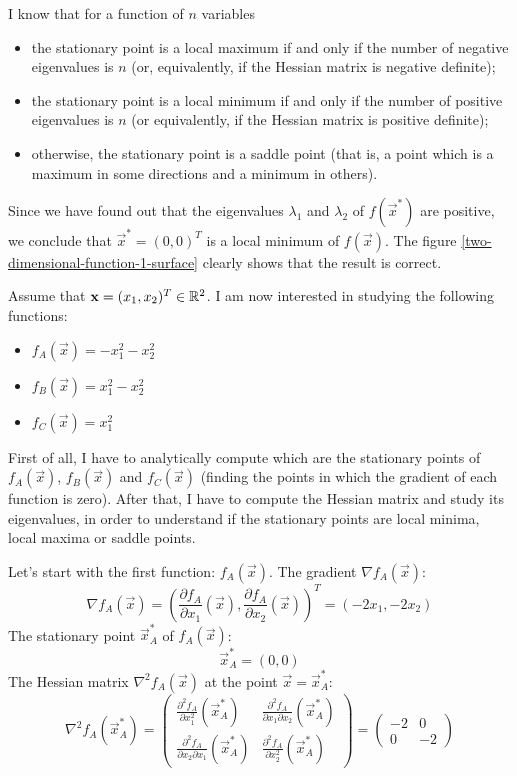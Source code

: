     I know that for a function of \(n\) variables
    \begin{itemize}
        \item the stationary point is a local maximum if and only if the number of negative eigenvalues is \(n\) (or, equivalently, if the Hessian matrix is negative definite);
        \item the stationary point is a local minimum if and only if the number of positive eigenvalues is \(n\) (or equivalently, if the Hessian matrix is positive definite);
        \item otherwise, the stationary point is a saddle point (that is, a point which is a maximum in some directions and a minimum in others).
    \end{itemize}
    Since we have found out that the eigenvalues \(\lambda_1\) and \(\lambda_2\) of \(f(\vec{x}^*)\) are positive, we conclude that \(\vec{x}^* = (0, 0)^T\) is a local minimum of \(f(\vec{x})\). The figure \ref{two-dimensional-function-1-surface} clearly shows that the result is correct.\par
    Assume that \(\mathbf{x} = (x_1, x_2)^T \in \mathbb{R}^2\). I am now interested in studying the following functions:
    \begin{itemize}
        \item \(f_A(\vec{x}) = -x_1^2-x_2^2\)
        \item \(f_B(\vec{x}) = x_1^2-x_2^2\)
        \item \(f_C(\vec{x}) = x_1^2\)
    \end{itemize}
    First of all, I have to analytically compute which are the stationary points of \(f_A(\vec{x})\), \(f_B(\vec{x})\) and \(f_C(\vec{x})\) (finding the points in which the gradient of each function is zero). After that, I have to compute the Hessian matrix and study its eigenvalues, in order to understand if the stationary points are local minima, local maxima or saddle points.\par
    Let's start with the first function: \(f_A(\vec{x})\). The gradient \(\nabla f_A(\vec{x})\):
    \[\nabla f_A(\vec{x}) = \left (\frac{\partial f_A}{\partial x_1}(\vec{x}), \frac{\partial f_A}{\partial x_2}(\vec{x}) \right )^T = (-2x_1, -2x_2)\]
    The stationary point \(\vec{x}_A^*\) of \(f_A(\vec{x})\):
    \[\vec{x}_A^* = (0, 0)\]
    The Hessian matrix \(\nabla^2 f_A(\vec{x})\) at the point \(\vec{x} = \vec{x}_A^*\):
    \[
        \nabla^2 f_A(\vec{x}_A^*) =
        \begin{pmatrix}
            \frac{\partial^2 f_A}{\partial x_1^2}(\vec{x}^*_A) &
            \frac{\partial^2 f_A}{\partial x_1 \partial x_2}(\vec{x}^*_A) \\
            \frac{\partial^2 f_A}{\partial x_2 \partial x_1}(\vec{x}^*_A) &
            \frac{\partial^2 f_A}{\partial x_2^2}(\vec{x}^*_A)
        \end{pmatrix}
        =
        \begin{pmatrix}
            -2 & 0 \\
            0 & -2
        \end{pmatrix}
    \]
